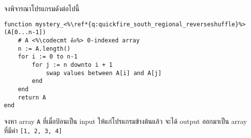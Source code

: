 \question{\label{q:quickfire_south_regional_reverseshuffle}}

จงพิจารณาโปรแกรมดังต่อไปนี้
\begin{lstlisting}
function mystery_<%\ref*{q:quickfire_south_regional_reverseshuffle}%>(A[0...n-1])
    # A <%\codecmt คือ%> 0-indexed array  
    n := A.length()
    for i := 0 to n-1
        for j := n downto i + 1
            swap values between A[i] and A[j]
        end
    end
    return A
end
\end{lstlisting}

จงหา array \lstinline{A} ที่เมื่อป้อนเป็น input ให้แก่โปรแกรมข้างต้นแล้ว
จะได้ output ออกมาเป็น array ที่มีค่า \lstinline{[1, 2, 3, 4]}

